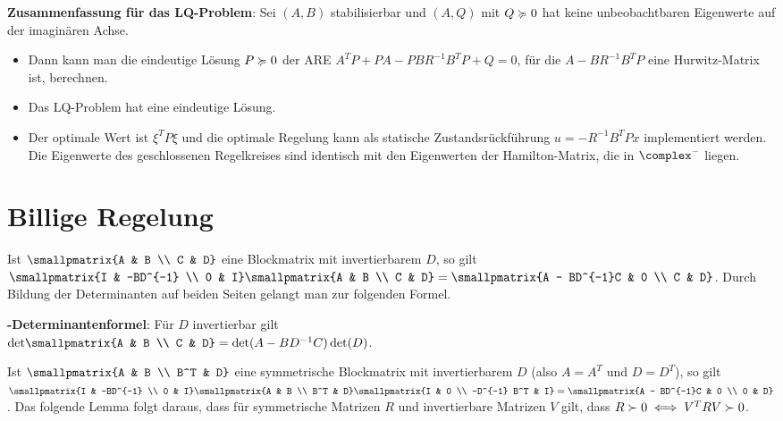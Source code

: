 \textbf{Zusammenfassung für das LQ-Problem}:
Sei $(A, B)$ stabilisierbar und $(A, Q)$ mit $Q \succcurlyeq 0$ hat keine
unbeobachtbaren Eigenwerte auf der imaginären Achse.
\begin{itemize}
    \item
    Dann kann man die eindeutige Lösung $P \succcurlyeq 0$ der ARE
    $A^T P + PA - PBR^{-1} B^T P + Q = 0$,
    für die $A - BR^{-1} B^T P$ eine Hurwitz-Matrix ist, berechnen.

    \item
    Das LQ-Problem hat eine eindeutige Lösung.

    \item
    Der optimale Wert ist $\xi^T P \xi$ und die optimale Regelung kann als statische
    Zustandsrückführung $u = -R^{-1} B^T Px$ implementiert werden.
    Die Eigenwerte des geschlossenen Regelkreises sind identisch mit den Eigenwerten
    der Hamilton-Matrix, die in $\complex^-$ liegen.
\end{itemize}

\pagebreak

\section{%
    Billige Regelung%
}

Ist $\smallpmatrix{A & B \\ C & D}$ eine Blockmatrix mit invertierbarem $D$,
so gilt
$\smallpmatrix{I & -BD^{-1} \\ 0 & I} \smallpmatrix{A & B \\ C & D} =
\smallpmatrix{A - BD^{-1}C & 0 \\ C & D}$.
Durch Bildung der Determinanten auf beiden Seiten gelangt man zur folgenden Formel.

\textbf{-Determinantenformel}:
Für $D$ invertierbar gilt\\
$\det\!\smallpmatrix{A & B \\ C & D} = \det(A - BD^{-1}C) \det(D)$.

Ist $\smallpmatrix{A & B \\ B^T & D}$ eine symmetrische Blockmatrix mit invertierbarem $D$
(also $A = A^T$ und $D = D^T$), so gilt
$\smallpmatrix{I & -BD^{-1} \\ 0 & I} \smallpmatrix{A & B \\ B^T & D}
\smallpmatrix{I & 0 \\ -D^{-1} B^T & I} = \smallpmatrix{A - BD^{-1}C & 0 \\ 0 & D}$.
Das folgende Lemma folgt daraus, dass für symmetrische Matrizen $R$ und
invertierbare Matrizen $V$ gilt, dass $R \succ 0 \iff V^T RV \succ 0$.

